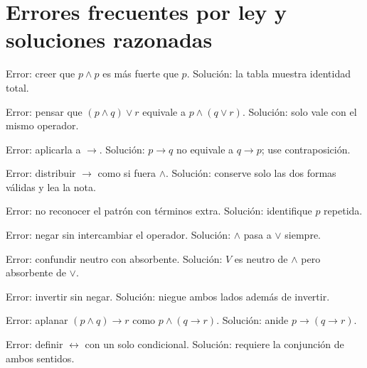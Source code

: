 \documentclass[11pt,a4paper,openany]{book}
\begin{document}
\chapter{Errores frecuentes por ley y soluciones razonadas}
\label{ch:errores-ley}
\begin{description}[leftmargin=*]
\item[Idempotencia.] Error: creer que $p \land p$ es m\'as fuerte que $p$. Soluci\'on: la tabla muestra identidad total.
\item[Asociativa.] Error: pensar que $(p \land q) \lor r$ equivale a $p \land (q \lor r)$. Soluci\'on: solo vale con el mismo operador.
\item[Conmutativa.] Error: aplicarla a $\to$. Soluci\'on: $p \to q$ no equivale a $q \to p$; use contraposici\'on.
\item[Distributiva.] Error: distribuir $\to$ como si fuera $\land$. Soluci\'on: conserve solo las dos formas v\'alidas y lea la nota.
\item[Absorci\'on.] Error: no reconocer el patr\'on con t\'erminos extra. Soluci\'on: identifique $p$ repetida.
\item[Morgan.] Error: negar sin intercambiar el operador. Soluci\'on: $\land$ pasa a $\lor$ siempre.
\item[Identidad.] Error: confundir neutro con absorbente. Soluci\'on: $V$ es neutro de $\land$ pero absorbente de $\lor$.
\item[Contraposici\'on.] Error: invertir sin negar. Soluci\'on: niegue ambos lados adem\'as de invertir.
\item[Exportaci\'on.] Error: aplanar $(p \land q) \to r$ como $p \land (q \to r)$. Soluci\'on: anide $p \to (q \to r)$.
\item[Definici\'on.] Error: definir $\leftrightarrow$ con un solo condicional. Soluci\'on: requiere la conjunci\'on de ambos sentidos.
\end{description}
\end{document}

